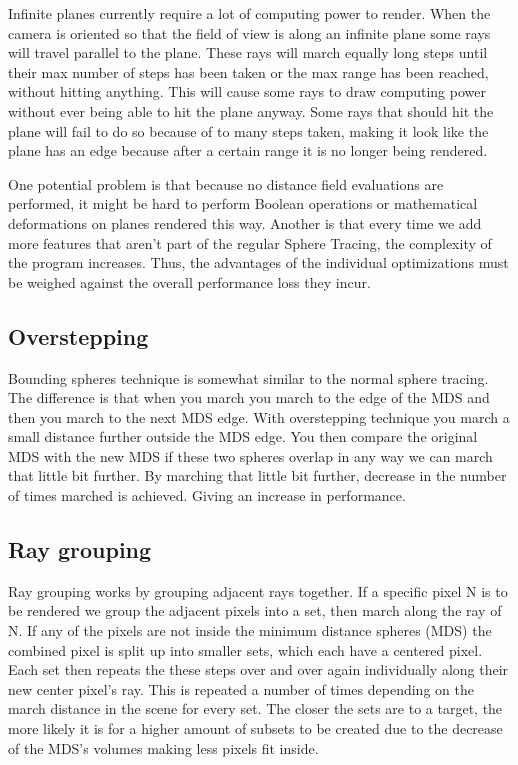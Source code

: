 			Infinite planes currently require a lot of computing power to
			render. When the camera is oriented so that the field of view is
			along an infinite plane some rays will travel parallel to the
			plane. These rays will march equally long steps until their max
			number of steps has been taken or the max range has been reached, 
			without hitting anything. This will cause some rays to draw 
			computing power without ever being able to hit the plane anyway. 
			Some rays that should hit the plane will fail to do so because of 
			to many steps taken, making it look like the plane has an edge 
			because after a certain range it is no longer being rendered.

			One potential problem is that because no distance field evaluations 
			are performed, it might be hard to perform Boolean operations or 
			mathematical deformations on planes rendered this way. Another is 
			that every time we add more features that aren't part of the 
			regular Sphere Tracing, the complexity of the program increases. 
			Thus, the advantages of the individual optimizations must be 
			weighed against the overall performance loss they incur. 

		\subsection{Overstepping}

			Bounding spheres technique is somewhat similar to the normal sphere
			tracing. The difference is that when you march you march to the
			edge of the MDS and then you march to the next MDS edge. With
			overstepping technique you march a small distance further outside
			the MDS edge. You then compare the original MDS with the new MDS if
			these two spheres overlap in any way we can march that little bit
			further. By marching that little bit further, decrease in the
			number of times marched is achieved. Giving an increase in
			performance. 

		\subsection{Ray grouping}
		
			Ray grouping works by grouping adjacent rays together. If a
			specific pixel N is to be rendered we group the adjacent pixels
			into a set, then march along the ray of N. If any of the pixels are
			not inside the minimum distance spheres (MDS) the combined pixel is
			split up into smaller sets, which each have a centered pixel. Each
			set then repeats the these steps over and over again individually
			along their new center pixel's ray.  This is repeated a number of
			times depending on the march distance in the scene for every set.
			The closer the sets are to a target, the more likely it is for a
			higher amount of subsets to be created due to the decrease of the
			MDS's volumes making less pixels fit inside.
			
